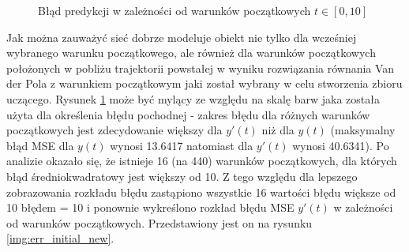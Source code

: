 \begin{figure}[ht!]
	\centering

	

	\caption{Błąd predykcji w zależności od warunków początkowych $t \in [0,10]$}
	\label{img:err_initial}
\end{figure}

Jak można zauważyć sieć dobrze modeluje obiekt nie tylko dla wcześniej wybranego warunku początkowego, ale również dla warunków początkowych położonych w pobliżu trajektorii powstałej w wyniku rozwiązania równania Van der Pola z warunkiem początkowym jaki został wybrany w celu stworzenia zbioru uczącego. Rysunek \ref{img:err_initial} może być mylący ze względu na skalę barw jaka została użyta dla określenia błędu pochodnej - zakres błędu dla różnych warunków początkowych jest zdecydowanie większy dla $y'(t)$ niż dla $y(t)$ (maksymalny błąd MSE dla $y(t)$ wynosi 13.6417 natomiast dla $y'(t)$ wynosi 40.6341). Po analizie okazało się, że istnieje 16 (na 440) warunków początkowych, dla których błąd średniokwadratowy jest większy od 10. Z tego względu dla lepszego zobrazowania rozkładu błędu zastąpiono wszystkie 16 wartości błędu większe od 10 błędem = 10 i ponownie wykreślono rozkład błędu MSE $y'(t)$ w zależności od warunków początkowych. Przedstawiony jest on na rysunku \ref{img:err_initial_new}.

